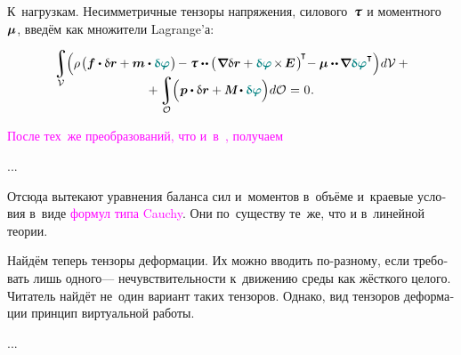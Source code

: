 \begin{otherlanguage}{russian}
К~нагрузкам.
Несимметричные тензоры напряжения, силового~$\forcestresstensor$ и моментного~$\bm{\mu}$, введём как множители Lagrange’а:

\nopagebreak\vspace{-0.3em}\begin{multline}
\integral\displaylimits_{\mathcal{V}} \hspace{-0.64ex}
\left(^{\mathstrut} \hspace{-0.1ex}
\rho \hspace{.2ex} \bigl(
\bm{f} \dotp \variation{\currentlocationvector}
+ \bm{m} \dotp \littlerotationvector
\hspace{.1ex} \bigr) \hspace{-0.2ex}
- \forcestresstensor \dotdotp \hspace{-0.1ex} \bigl( \hspace{.16ex} \boldnabla \variation{\currentlocationvector} + \littlerotationvector \hspace{-0.2ex} \times \hspace{-0.25ex} \UnitDyad \hspace{.2ex} \bigr)^{\hspace{-0.25ex}\T} \hspace{-0.5ex}
- \couplestresstensor \dotdotp \hspace{-0.16ex} \boldnabla \littlerotationvector^{\T}
\right) \hspace{-0.3ex} d\mathcal{V}
\hspace{.5ex} + \\[-1.2em]
%
+ \integral\displaylimits_{\mathcal{O}} \hspace{-0.64ex}
\left(^{\mathstrut}
\bm{p} \dotp \variation{\currentlocationvector}
+ \mathboldM \hspace{-0.1ex} \dotp \littlerotationvector
\right) \hspace{-0.3ex} d\mathcal{O} \hspace{.1ex}
= \hspace{.1ex} 0 \hspace{.1ex} .
\end{multline}

\textcolor{magenta}{После тех~же преобразований, что и~в~, получаем}

...

Отсюда вытекают уравнения баланса сил и~моментов в~объёме и~краевые условия в~виде \textcolor{magenta}{формул типа Cauchy}.
Они по~существу те~же, что и в~линейной теории.

Найдём теперь тензоры деформации.
Их можно вводить по\hbox{-}разному, если требовать лишь одного\:--- нечувствительности к~движению среды как жёсткого целого.
Читатель найдёт не~один вариант таких тензоров.
Однако, вид тензоров деформации  принцип виртуальной работы.

...



\end{otherlanguage}

